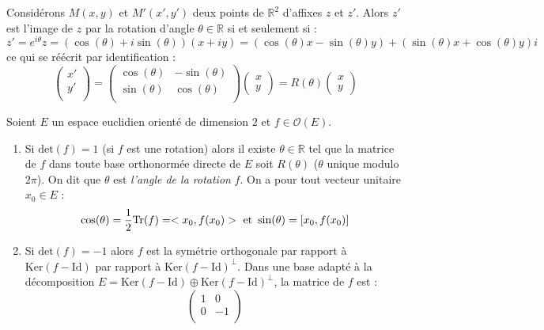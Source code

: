\documentclass[a4paper,10pt]{report}
\begin{document}
\begin{rem} Considérons $M(x,y)$ et $M'(x',y')$ deux points de $\mathbb{R}^2$ d'affixes $z$ et $z'$. Alors $z'$ est l'image de $z$ par la rotation d'angle $\theta \in \mathbb{R}$ si et seulement si :
$$z'= e^{i \theta } z = (\cos(\theta) + i \sin(\theta))(x+iy) = (\cos(\theta) x- \sin(\theta)y) + (\sin(\theta)x+ \cos(\theta)y)i$$
\noindent ce qui se réécrit par identification :
$$ \begin{pmatrix}
x'\\
y' \\
\end{pmatrix} = \begin{pmatrix}
\cos(\theta) & - \sin(\theta) \\
\sin(\theta) & \cos(\theta) \\
\end{pmatrix} \begin{pmatrix}
x \\
y
\end{pmatrix} = R(\theta) \begin{pmatrix}
x \\
y
\end{pmatrix}$$
\end{rem}

\begin{thm}
Soient $E$ un espace euclidien orienté de dimension $2$ et $f \in \mathcal{O}(E)$.
\begin{enumerate}
\item Si $\textrm{det}(f)=1$ (si $f$ est une rotation) alors il existe $\theta \in \mathbb{R}$ tel que la matrice de $f$ dans toute base orthonormée directe de $E$ soit $R(\theta)$ ($\theta$ unique modulo $2 \pi$). On dit que $\theta$ est \textit{l'angle de la rotation} $f$. On a pour tout vecteur unitaire $x_0 \in E$ :
$$ \cos(\theta) = \dfrac{1}{2} \textrm{Tr}(f)=<x_0,f(x_0)> \hbox{ et } \sin(\theta) = [x_0, f(x_0) ]$$
\item Si $\textrm{det}(f) = -1$ alors $f$ est la symétrie orthogonale par rapport à $\textrm{Ker}(f-\textrm{Id})$ par rapport à $\textrm{Ker}(f-\textrm{Id})^{\perp}$. Dans une base adapté à la décomposition $E= \textrm{Ker}(f-\textrm{Id}) \oplus \textrm{Ker}(f-\textrm{Id})^{\perp}$, la matrice de $f$ est :
$$ \begin{pmatrix}
1 & 0 \\
0 & -1 \\
\end{pmatrix}$$
\end{enumerate}
\end{thm}
\end{document}

